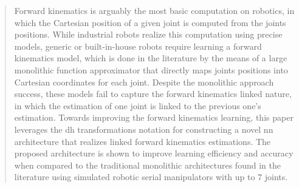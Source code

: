 \begin{abstract}
	Forward kinematics is arguably the most basic computation on robotics, in which the Cartesian position of a given joint is computed from the joints positions.
	While industrial robots realize this computation using precise models, generic or built-in-house robots require learning a forward kinematics model, which is done in the literature by the means of a large monolithic function approximator that directly maps joints positions into Cartesian coordinates for each joint.
	Despite the monolithic approach success, these models fail to capture the forward kinematics linked nature, in which the estimation of one joint is linked to the previous one's estimation.
	Towards improving the forward kinematics learning, this paper leverages the \acrlong{dh} transformations notation for constructing a novel \acrlong{nn} architecture that realizes linked forward kinematics estimations.
	The proposed architecture is shown to improve learning efficiency and accuracy when compared to the traditional monolithic architectures found in the literature using simulated robotic serial manipulators with up to $7$ joints.
\end{abstract}

